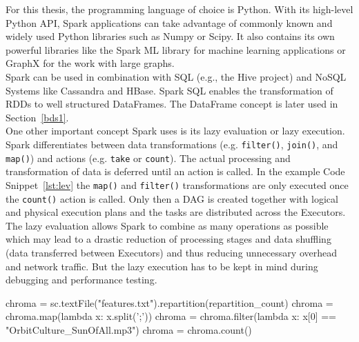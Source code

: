 For this thesis, the programming language of choice is Python. With its high-level Python API, Spark applications can take advantage of commonly known and widely used Python libraries such as Numpy or Scipy. It also contains its own powerful libraries like the Spark ML library for machine learning applications or GraphX for the work with large graphs.\\ 
Spark can be used in combination with SQL (e.g., the Hive project) and NoSQL Systems like Cassandra and HBase. Spark SQL enables the transformation of RDDs to well structured DataFrames. The DataFrame concept is later used in Section~\ref{bds1}.\\
One other important concept Spark uses is its lazy evaluation or lazy execution. Spark differentiates between data transformations (e.g. \lstinline{filter()}, \lstinline{join()}, and \lstinline{map()}) and actions (e.g. \lstinline{take} or \lstinline{count}). The actual processing and transformation of data is deferred until an action is called. In the example Code Snippet~\ref{lst:lev} the \lstinline{map()} and \lstinline{filter()} transformations are only executed once the \lstinline{count()} action is called. Only then a DAG is created together with logical and physical execution plans and the tasks are distributed across the Executors. The lazy evaluation allows Spark to combine as many operations as possible which may lead to a drastic reduction of processing stages and data shuffling (data transferred between Executors) and thus reducing unnecessary overhead and  network traffic. But the lazy execution has to be kept in mind during debugging and performance testing.~\cite[p.73]{sparkbook1}

\begin{pythonCode}[frame=single,label={lst:lev},caption={Lazy evaluation},captionpos=b]
chroma = sc.textFile("features.txt").repartition(repartition_count)
chroma = chroma.map(lambda x: x.split(';'))
chroma = chroma.filter(lambda x: x[0] == "OrbitCulture_SunOfAll.mp3")
chroma = chroma.count()
\end{pythonCode}

